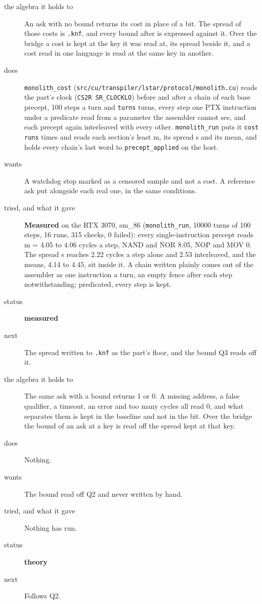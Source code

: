 \begin{description}
\item[{the algebra it holds to}] An ask with no bound returns its cost in place of a bit. The spread of those costs is \texttt{.\allowbreak{}knf}, and every bound after is expressed against it. Over the bridge a cost is kept at the key it was read at, its spread beside it, and a cost read in one language is read at the same key in another.
\item[{does}] \texttt{monolith\_\allowbreak{}cost} (\texttt{src/\allowbreak{}cu/\allowbreak{}transpiler/\allowbreak{}lstar/\allowbreak{}protocol/\allowbreak{}monolith.\allowbreak{}cu}) reads the part's clock (\texttt{CS2R SR\_\allowbreak{}CLOCKLO}) before and after a chain of each base precept, 100 steps a turn and \texttt{turns} turns, every step one PTX instruction under a predicate read from a parameter the assembler cannot see, and each precept again interleaved with every other. \texttt{monolith\_\allowbreak{}run} puts it \texttt{cost runs} times and reads each section's least m, its spread s and its mean, and holds every chain's last word to \texttt{precept\_\allowbreak{}applied} on the host.
\item[{wants}] A watchdog stop marked as a censored sample and not a cost. A reference ask put alongside each real one, in the same conditions.
\item[{tried, and what it gave}] \textbf{Measured} on the RTX 3070, sm\_\allowbreak{}86 (\texttt{monolith\_\allowbreak{}run}, 10000 turns of 100 steps, 16 runs, 315 checks, 0 failed): every single-instruction precept reads m = 4.05 to 4.06 cycles a step, NAND and NOR 8.05, NOP and MOV 0. The spread s reaches 2.22 cycles a step alone and 2.53 interleaved, and the means, 4.14 to 4.45, sit inside it. A chain written plainly comes out of the assembler as one instruction a turn, an empty fence after each step notwithstanding; predicated, every step is kept.
\item[{status}] \textbf{measured}
\item[{next}] The spread written to \texttt{.\allowbreak{}knf} as the part's floor, and the bound Q3 reads off it.
\end{description}

\begin{description}
\item[{the algebra it holds to}] The same ask with a bound returns 1 or 0. A missing address, a false qualifier, a timeout, an error and too many cycles all read 0, and what separates them is kept in the baseline and not in the bit. Over the bridge the bound of an ask at a key is read off the spread kept at that key.
\item[{does}] Nothing.
\item[{wants}] The bound read off Q2 and never written by hand.
\item[{tried, and what it gave}] Nothing has run.
\item[{status}] \textbf{theory}
\item[{next}] Follows Q2.
\end{description}

